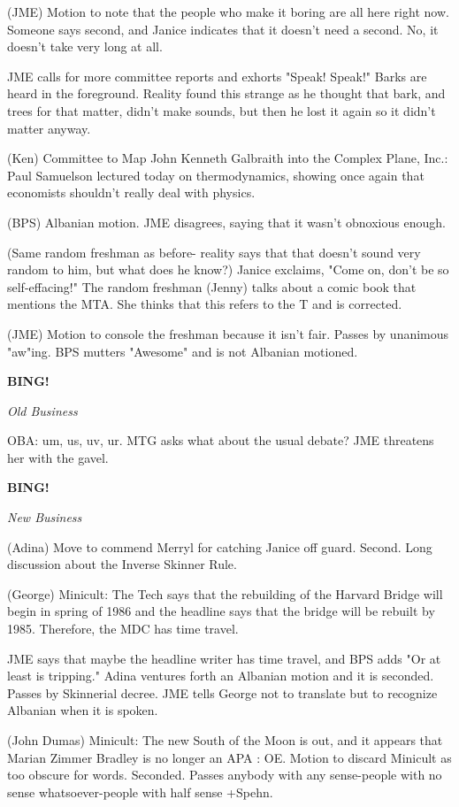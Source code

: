 \documentclass[12pt]{article}
\newcommand{\bing}{{\bf BING!} }
\newcommand{\goto}[1]{\bing \vskip 12pt \centerline{{\em{#1}}}}
\begin{document}
(JME) Motion to note that the people who make it boring are all here right now. Someone says second, and Janice indicates that it doesn't need a second. No, it doesn't take very long at all.

JME calls for more committee reports and exhorts "Speak! Speak!" Barks are heard in the foreground. Reality found this strange as he thought that bark, and trees for that matter, didn't make sounds, but then he lost it again so it didn't matter anyway.

(Ken) Committee to Map John Kenneth Galbraith into the Complex Plane, Inc.: Paul Samuelson lectured today on thermodynamics, showing once again that economists shouldn't really deal with physics.

(BPS) Albanian motion. JME disagrees, saying that it wasn't obnoxious enough.

(Same random freshman as before- reality says that that doesn't sound very random to him, but what does he know?) Janice exclaims, "Come on, don't be so self-effacing!" The random freshman (Jenny) talks about a comic book that mentions the MTA. She thinks that this refers to the T and is corrected.

(JME) Motion to console the freshman because it isn't fair. Passes by unanimous "aw"ing. BPS mutters "Awesome" and is not Albanian motioned.

\goto{Old Business}

OBA: um, us, uv, ur. MTG asks what about the usual debate? JME threatens her with the gavel.

\goto{New Business}

(Adina) Move to commend Merryl for catching Janice off guard. Second. Long discussion about the Inverse Skinner Rule.

(George) Minicult: The Tech says that the rebuilding of the Harvard Bridge will begin in spring of 1986 and the headline says that the bridge will be rebuilt by 1985. Therefore, the MDC has time travel.

JME says that maybe the headline writer has time travel, and BPS adds "Or at least is tripping." Adina ventures forth an Albanian motion and it is seconded. Passes by Skinnerial decree. JME tells George not to translate but to recognize Albanian when it is spoken.

(John Dumas) Minicult: The new South of the Moon is out, and it appears that Marian Zimmer Bradley is no longer an APA : OE. Motion to discard Minicult as too obscure for words. Seconded. Passes anybody with any sense-people with no sense whatsoever-people with half sense +Spehn.
\end{document}
